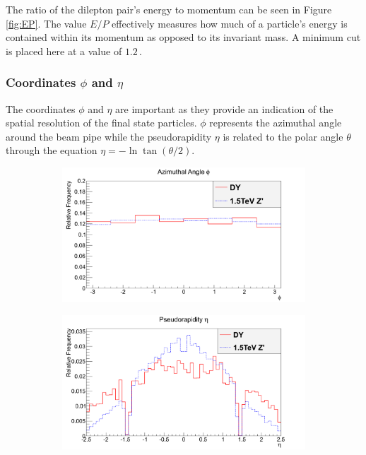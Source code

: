 \documentclass{article}
\begin{document}
The ratio of the dilepton pair's energy to momentum can be seen in Figure \ref{fig:EP}. The value $E/P$ effectively measures how much of a particle's energy is contained within its momentum as opposed to its invariant mass. A minimum cut is placed here at a value of $1.2\,$.

\subsubsection{Coordinates $\phi$ and $\eta$}

The coordinates $\phi$ and $\eta$ are important as they provide an indication of the spatial resolution of the final state particles. $\phi$ represents the azimuthal angle around the beam pipe while the pseudorapidity $\eta$ is related to the polar angle $\theta$ through the equation $\eta = -\ln \tan (\theta/2)$. 

\begin{figure}[h]
    \centering
    \begin{subfigure}{.49\textwidth}
        \includegraphics[height=0.6\textwidth]{images/variables/Phi.png}
        \caption{}
        \label{fig:phi}
    \end{subfigure}
    \begin{subfigure}{.49\textwidth}
        \includegraphics[height=0.6\textwidth]{images/variables/Eta.png}
        \caption{}
        \label{fig:eta}
    \end{subfigure}
    \caption{\label{fig:etaPhi}}
\end{figure}
\end{document}
